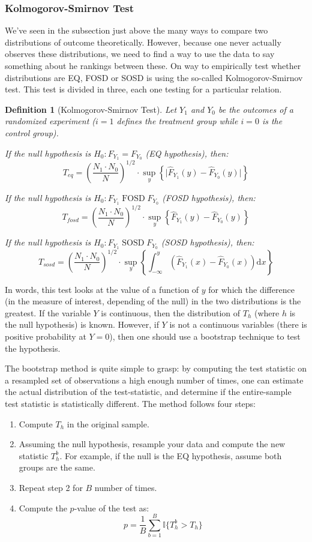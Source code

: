 \documentclass[12pt]{report}
\def\D{\mathrm{d}}
\newtheorem{definition}{Definition}[chapter]
\def\D{\mathrm{d}}
\def\D{\mathrm{d}}
\begin{document}
\subsubsection{Kolmogorov-Smirnov Test}

We've seen in the subsection just above the many ways to compare two distributions of outcome theoretically. However, because one never actually observes these distributions, we need to find a way to use the data to say something about he rankings between these. On way to empirically test whether distributions are EQ, FOSD or SOSD is using the so-called Kolmogorov-Smirnov test. This test is divided in three, each one testing for a particular relation.

\begin{definition}[Kolmogorov-Smirnov Test]
Let $Y_1$ and $Y_0$ be the outcomes of a randomized experiment ($i =1$ defines the treatment group while $i=0$ is the control group).

If the null hypothesis is $H_0: F_{Y_1} = F_{Y_0}$ (EQ hypothesis), then: $$T_{eq} = \left(\frac{N_1\cdot N_0}{N}\right)^{1/2} \cdot \sup_{y} \left\lbrace\vert \hat F_{Y_1}(y) - \hat F_{Y_0}(y)\vert\right\rbrace $$

If the null hypothesis is $H_0: F_{Y_1} \operatorname{FOSD} F_{Y_0}$ (FOSD hypothesis), then: $$T_{fosd} = \left(\frac{N_1\cdot N_0}{N}\right)^{1/2} \cdot \sup_{y} \left\lbrace\hat F_{Y_1}(y) - \hat F_{Y_0}(y)\right\rbrace $$

If the null hypothesis is $H_0: F_{Y_1} \operatorname{SOSD} F_{Y_0}$ (SOSD hypothesis), then: $$T_{sosd} = \left(\frac{N_1\cdot N_0}{N}\right)^{1/2} \cdot \sup_{y} \left\lbrace \int_{-\infty}^y (\hat F_{Y_1}(x) - \hat F_{Y_0}(x))\D x\right\rbrace $$
\end{definition}

In words, this test looks at the value of a function of $y$ for which the difference (in the measure of interest, depending of the null) in the two distributions is the greatest. If the variable $Y$ is continuous, then the distribution of $T_h$ (where $h$ is the null hypothesis) is known. However, if $Y$ is not a continuous variables (there is positive probability at $Y=0$), then one should use a bootstrap technique to test the hypothesis.

The bootstrap method is quite simple to grasp: by computing the test statistic on a resampled set of observations a high enough number of times, one can estimate the actual distribution of the test-statistic, and determine if the entire-sample test statistic is statistically different. The method follows four steps:\begin{enumerate}
\item Compute $T_h$ in the original sample.
\item Assuming the null hypothesis, resample your data and compute the new statistic $T_h^b$. For example, if the null is the EQ hypothesis, assume both groups are the same.
\item Repeat step 2 for $B$ number of times.
\item Compute the $p$-value of the test as: $$p = \frac{1}{B}\sum_{b=1}^{B}\mathbb{I}\{T_h^b>T_h\} $$
\end{enumerate}
\end{document}
